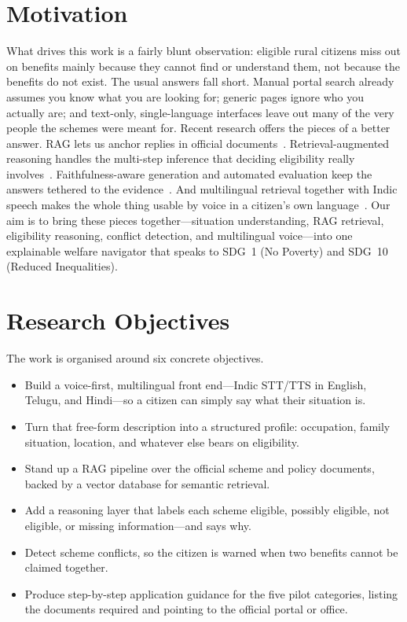 \documentclass[conference]{IEEEtran}
\begin{document}
\section{Motivation}
\label{sec:motivation}
What drives this work is a fairly blunt observation: eligible rural citizens miss out on benefits mainly because they cannot find or understand them, not because the benefits do not exist. The usual answers fall short. Manual portal search already assumes you know what you are looking for; generic pages ignore who you actually are; and text-only, single-language interfaces leave out many of the very people the schemes were meant for. Recent research offers the pieces of a better answer. RAG lets us anchor replies in official documents~\cite{lewis2020rag}. Retrieval-augmented reasoning handles the multi-step inference that deciding eligibility really involves~\cite{li2025ragreasoning,asai2024selfrag}. Faithfulness-aware generation and automated evaluation keep the answers tethered to the evidence~\cite{filice2025awf,es2024ragas}. And multilingual retrieval together with Indic speech makes the whole thing usable by voice in a citizen's own language~\cite{qi2025consistency,ranaldi2026multilingual,radford2023whisper}. Our aim is to bring these pieces together---situation understanding, RAG retrieval, eligibility reasoning, conflict detection, and multilingual voice---into one explainable welfare navigator that speaks to SDG~1 (No Poverty) and SDG~10 (Reduced Inequalities).

\section{Research Objectives}
\label{sec:objectives}
The work is organised around six concrete objectives.
\begin{itemize}
\item Build a voice-first, multilingual front end---Indic STT/TTS in English, Telugu, and Hindi---so a citizen can simply say what their situation is.
\item Turn that free-form description into a structured profile: occupation, family situation, location, and whatever else bears on eligibility.
\item Stand up a RAG pipeline over the official scheme and policy documents, backed by a vector database for semantic retrieval.
\item Add a reasoning layer that labels each scheme eligible, possibly eligible, not eligible, or missing information---and says why.
\item Detect scheme conflicts, so the citizen is warned when two benefits cannot be claimed together.
\item Produce step-by-step application guidance for the five pilot categories, listing the documents required and pointing to the official portal or office.
\end{itemize}
\end{document}
